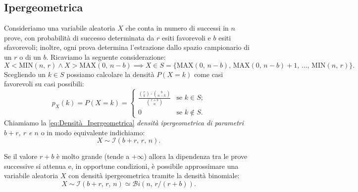         \subsection{Ipergeometrica}
            \begin{defn}
                Consideriamo una variabile aleatoria $X$ che conta in numero di successi in $n$ prove, con probabilità di successo determinata da $r$ esiti favorevoli e $b$ esiti sfavorevoli; inoltre, ogni prova determina l'estrazione dallo spazio campionario di un $r$ o di un $b$.
                Ricaviamo la seguente considerazione: \[
                    X < \scriptstyle\text{MIN}\textstyle(n,\,r) \land X > \scriptstyle\text{MAX}\textstyle(0,\,n-b) \implies X \in S = \{\scriptstyle\text{MAX}\textstyle(0,\,n-b),\, \scriptstyle\text{MAX}\textstyle(0,\,n-b) + 1,\, \ldots,\, \scriptstyle\text{MIN}\textstyle(n,\,r)\}
                .\] Scegliendo un $k \in S$ possiamo calcolare la densità $P(X = k)$ come casi favorevoli su casi possibili:
                \begin{equation}\label{eq:Densità_Ipergeometrica}
                    p_X(k) = P(X = k) = \begin{cases}
                        \frac{\binom{r}{k} \cdot \binom{b}{n-k}}{\binom{r+b}{n}} & \text{se $k \in S$;} \\
                        0 & \text{se $k \notin S$.}
                    \end{cases}
                \end{equation}
                Chiamiamo la \eqref{eq:Densità_Ipergeometrica} \emph{densità ipergeometrica di parametri $b+r$, $r$ e $n$} o in modo equivalente indichiamo: \[
                    X \sim \mathcal{I}(b+r,\, r,\, n)
                .\] 
            \end{defn}
            \begin{obsv}
                Se il valore $r+b$ è molto grande (tende a $+\infty$) allora la dipendenza tra le prove successive si attenua e, in opportune condizioni, è possibile approssimare una variabile aleatoria $X$ con densità ipergeometrica tramite la densità binomiale: \[
                    X \sim \mathcal{I}(b+r,\, r,\, n) \simeq \mathcal{B}i(n,\, r / (r+b))
                .\] 
            \end{obsv}
